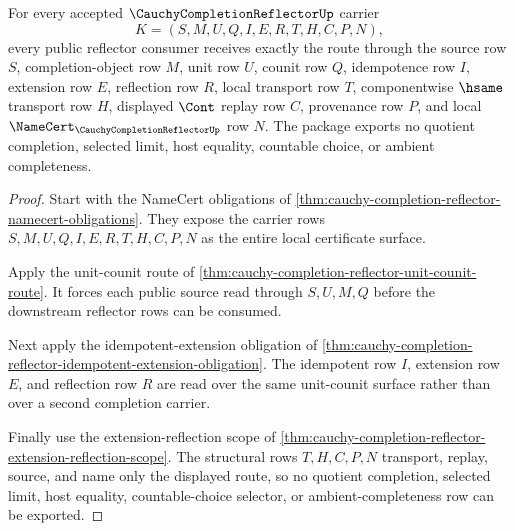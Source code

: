 \begin{theorem}
\label{thm:cauchy-completion-reflector-public-obligation-package}
For every accepted $\CauchyCompletionReflectorUp$ carrier
$$
K=(S,M,U,Q,I,E,R,T,H,C,P,N),
$$
every public reflector consumer receives exactly the route through the source row $S$, completion-object row $M$, unit row $U$, counit row $Q$, idempotence row $I$, extension row $E$, reflection row $R$, local transport row $T$, componentwise $\hsame$ transport row $H$, displayed $\Cont$ replay row $C$, provenance row $P$, and local $\NameCert_{\CauchyCompletionReflectorUp}$ row $N$. The package exports no quotient completion, selected limit, host equality, countable choice, or ambient completeness.
\end{theorem}
\begin{proof}
Start with the NameCert obligations of \autoref{thm:cauchy-completion-reflector-namecert-obligations}. They expose the carrier rows $S,M,U,Q,I,E,R,T,H,C,P,N$ as the entire local certificate surface.

Apply the unit-counit route of \autoref{thm:cauchy-completion-reflector-unit-counit-route}. It forces each public source read through $S,U,M,Q$ before the downstream reflector rows can be consumed.

Next apply the idempotent-extension obligation of \autoref{thm:cauchy-completion-reflector-idempotent-extension-obligation}. The idempotent row $I$, extension row $E$, and reflection row $R$ are read over the same unit-counit surface rather than over a second completion carrier.

Finally use the extension-reflection scope of \autoref{thm:cauchy-completion-reflector-extension-reflection-scope}. The structural rows $T,H,C,P,N$ transport, replay, source, and name only the displayed route, so no quotient completion, selected limit, host equality, countable-choice selector, or ambient-completeness row can be exported.
\end{proof}

